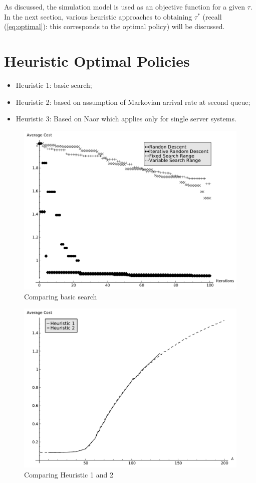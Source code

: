 \documentclass[12pt]{article}
\begin{document}
As discussed, the simulation model is used as an objective function for a given $\tau$.
In the next section, various heuristic approaches to obtaining $\tau^*$ (recall (\ref{eq:optimal}): this corresponds to the optimal policy) will be discussed.

\section{Heuristic Optimal Policies}\label{heuristicoptimalpolicies}

\begin{itemize}
\item Heuristic 1: basic search;
\item Heuristic 2: based on assumption of Markovian arrival rate at second queue;
\item Heuristic 3: Based on Naor which applies only for single server systems.
\end{itemize}

\begin{figure}[!hbtp]
    \begin{center}
        \includegraphics[width=.8\textwidth]{Images/Solver_Comp.pdf}
    \end{center}
    \caption{Comparing basic search}\label{basicsearch}
\end{figure}

\begin{figure}[!hbtp]
    \begin{center}
        \includegraphics[width=.8\textwidth]{Images/CaseStudyComp.pdf}
    \end{center}
    \caption{Comparing Heuristic 1 and 2}\label{casestudycomp}
\end{figure}
\end{document}
